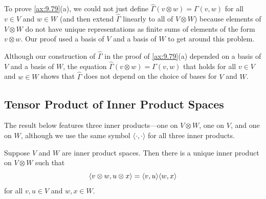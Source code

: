 To prove \ref{ax:9.79}(a), we could not just define
$\hat\Gamma(v\otimes w)=\Gamma(v,w)$ for all $v\in V$ and $w\in W$ (and then
extend $\hat\Gamma$ linearly to all of $V\otimes W$) because elements of
$V\otimes W$ do not have unique representations as finite sums of elements of
the form $v\otimes w$. Our proof used a basis of $V$ and a basis of $W$ to get
around this problem.

Although our construction of $\hat\Gamma$ in the proof of \ref{ax:9.79}(a)
depended on a basis of $V$ and a basis of $W$, the equation
$\hat\Gamma(v\otimes w)=\Gamma(v,w)$ that holds for all $v\in V$ and $w\in W$
shows that $\hat\Gamma$ does not depend on the choice of bases for $V$ and $W$.

\subsection{Tensor Product of Inner Product Spaces}

The result below features three inner products---one on $V\otimes W$, one on
$V$, and one on $W$, although we use the same symbol
$\langle\cdot,\cdot\rangle$ for all three inner products.

\begin{result}\label{ax:9.80}
Suppose $V$ and $W$ are inner product spaces. Then there is a unique inner
product on $V\otimes W$ such that
\[ \langle v\otimes w, u\otimes x \rangle = \langle v, u \rangle\langle w, x \rangle \]
for all $v,u\in V$ and $w,x\in W$.
\end{result}


